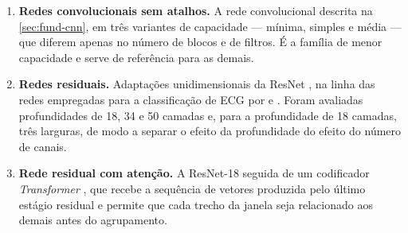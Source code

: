 \begin{enumerate}
	\item \textbf{Redes convolucionais sem atalhos.} A rede convolucional
	      descrita na \autoref{sec:fund-cnn}, em três variantes de capacidade ---
	      mínima, simples e média --- que diferem apenas no número de blocos e de
	      filtros. É a família de menor capacidade e serve de referência para as
	      demais.

	\item \textbf{Redes residuais.} Adaptações unidimensionais da ResNet
	      \cite{he2016deep}, na linha das redes empregadas para a classificação de
	      \gls{ECG} por  e
	      . Foram avaliadas profundidades de 18, 34
	      e 50 camadas e, para a profundidade de 18 camadas, três larguras, de modo a
	      separar o efeito da profundidade do efeito do número de canais.

	\item \textbf{Rede residual com atenção.} A ResNet-18 seguida de um
	      codificador \textit{Transformer} \cite{vaswani2017attention}, que recebe a
	      sequência de vetores produzida pelo último estágio residual e permite que
	      cada trecho da janela seja relacionado aos demais antes do agrupamento.

\end{enumerate}

